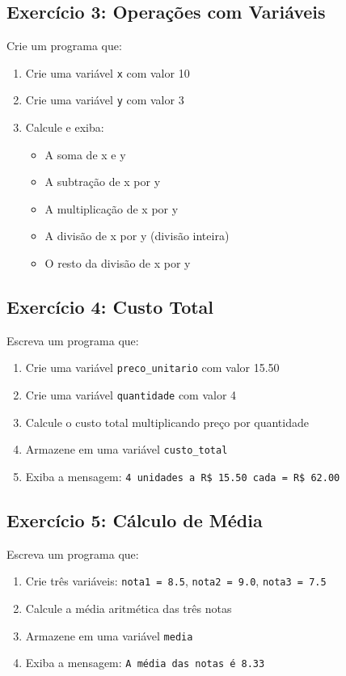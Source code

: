 \documentclass[12pt]{article}
\begin{document}
\subsection*{Exercício 3: Operações com Variáveis}
Crie um programa que:
\begin{enumerate}
    \item Crie uma variável \texttt{x} com valor 10
    \item Crie uma variável \texttt{y} com valor 3
    \item Calcule e exiba:
    \begin{itemize}
        \item A soma de x e y
        \item A subtração de x por y
        \item A multiplicação de x por y
        \item A divisão de x por y (divisão inteira)
        \item O resto da divisão de x por y
    \end{itemize}
\end{enumerate}

\subsection*{Exercício 4: Custo Total}
Escreva um programa que:
\begin{enumerate}
    \item Crie uma variável \texttt{preco\_unitario} com valor 15.50
    \item Crie uma variável \texttt{quantidade} com valor 4
    \item Calcule o custo total multiplicando preço por quantidade
    \item Armazene em uma variável \texttt{custo\_total}
    \item Exiba a mensagem: \texttt{4 unidades a R\$ 15.50 cada = R\$ 62.00}
\end{enumerate}

\subsection*{Exercício 5: Cálculo de Média}
Escreva um programa que:
\begin{enumerate}
    \item Crie três variáveis: \texttt{nota1 = 8.5}, \texttt{nota2 = 9.0}, \texttt{nota3 = 7.5}
    \item Calcule a média aritmética das três notas
    \item Armazene em uma variável \texttt{media}
    \item Exiba a mensagem: \texttt{A média das notas é 8.33}
\end{enumerate}
\end{document}
